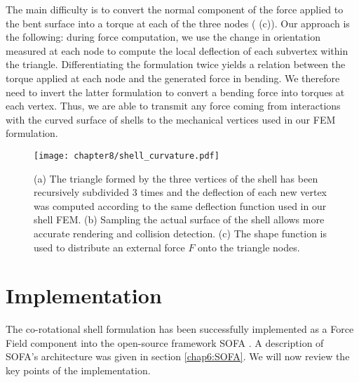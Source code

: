 The main difficulty is to convert the normal component of the force applied to the bent surface into a torque at each of the three nodes ( (c)). Our approach is the following: during force computation, we use the change in orientation measured at each node to compute the local deflection of each subvertex within the triangle. Differentiating the formulation twice yields a relation between the torque applied at each node and the generated force in bending. We therefore need to invert the latter formulation to convert a bending force into torques at each vertex. Thus, we are able to transmit any force coming from interactions with the curved surface of shells to the mechanical vertices used in our FEM formulation. 
%
\begin{figure}[ht]
\centering
\texttt{[image: chapter8/shell\_curvature.pdf]}
\caption[Subdivision of the shell for rendering and collision detection]{(a)  The triangle formed by the three vertices of the shell has been recursively subdivided 3 times and the deflection of each new vertex was computed according to the same deflection function used in our shell FEM. (b) Sampling the actual surface of the shell allows more accurate rendering and collision detection. (c) The shape function is used to distribute an external force $F$ onto the triangle nodes.}
\label{chap8:fig-shell}
\end{figure}


\section{Implementation}

The co-rotational shell formulation has been successfully implemented as a Force Field component into the open-source framework SOFA \citep{Allard07}. A description of SOFA's architecture was given in section \ref{chap6:SOFA}. We will now review the key points of the implementation.

